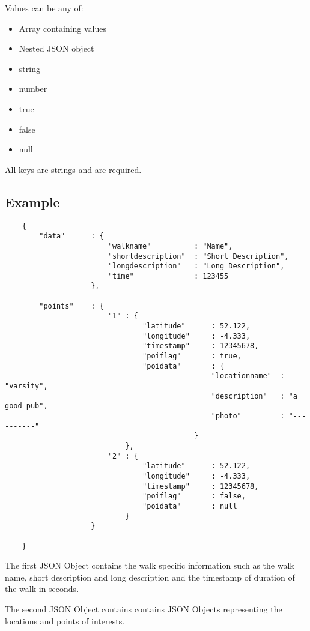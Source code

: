 \documentclass{project}
\begin{document}
Values can be any of:
\begin{itemize}
\item Array containing values
\item Nested JSON object
\item string
\item number
\item true
\item false
\item null
\end{itemize}

All keys are strings and are required.

\subsection{Example}

\begin{verbatim}
	{
    	"data" 		: {
                        "walkname"			: "Name",
                    	"shortdescription"	: "Short Description",
                    	"longdescription"	: "Long Description",
                    	"time"				: 123455
                 	},
   		
        "points"	: {
        				"1" : {
                                "latitude"		: 52.122,
                                "longitude"		: -4.333,
                                "timestamp"		: 12345678,
                                "poiflag"		: true,
                                "poidata"		: {
                                                "locationname"	: "varsity",
                                                "description"	: "a good pub",
                                                "photo"			: "----------"
                                			}
                        	},
                     	"2" : {
                                "latitude"		: 52.122,
                                "longitude"		: -4.333,
                                "timestamp"		: 12345678,
                                "poiflag"		: false,
                                "poidata"		: null
                        	}
        			}
    
    }

\end{verbatim}

The first JSON Object contains the walk specific information such as the walk name, short description and long description and the timestamp of duration of the walk in seconds.

The second JSON Object contains contains JSON Objects representing the locations and points of interests.
\end{document}
